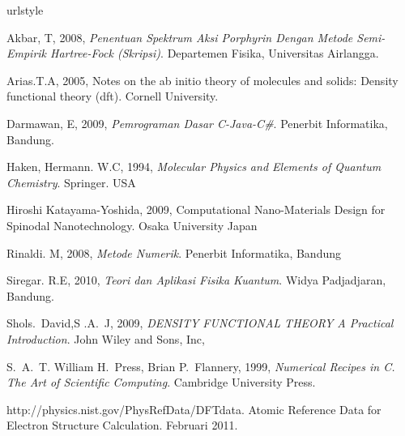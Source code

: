 



%
% 
% 


\begin{thebibliography}{7}
%
\providecommand{\natexlab}[1]{#1}
\providecommand{\url}[1]{\texttt{#1}}
\expandafter\ifx\csname urlstyle\endcsname\relax
  \providecommand{\doi}[1]{doi: #1}\else
  \providecommand{\doi}{doi: \begingroup \urlstyle{rm}\Url}\fi

Akbar, T, 2008,
\newblock \emph{Penentuan Spektrum Aksi \textit{Porphyrin} Dengan Metode
  Semi-Empirik \textit{Hartree-Fock} (Skripsi)}.
\newblock Departemen Fisika, Universitas Airlangga.

Arias.T.A, 2005,
\newblock Notes on the ab initio theory of molecules and solids: Density
  functional theory (dft).
\newblock Cornell University.

Darmawan, E, 2009,
\newblock \emph{Pemrograman Dasar C-Java-C\#}.
\newblock Penerbit Informatika, Bandung.

Haken, Hermann. W.C, 1994,
\newblock \emph{{M}olecular {P}hysics and {E}lements of {Q}uantum {C}hemistry}.
\newblock Springer. USA

Hiroshi Katayama-Yoshida, 2009,
\newblock Computational Nano-Materials Design for Spinodal Nanotechnology.
\newblock Osaka University Japan

Rinaldi. M, 2008,
\newblock \emph{Metode Numerik}.
\newblock Penerbit Informatika, Bandung

Siregar. R.E, 2010,
\newblock \emph{Teori dan Aplikasi Fisika Kuantum}.
\newblock Widya Padjadjaran, Bandung.

Shols.~David,S .A.~J, 2009,
\newblock \emph{{D}ENSITY {F}UNCTIONAL {T}HEORY A {P}ractical {I}ntroduction}.
\newblock John Wiley and Sons, Inc,

S.~A.~T. William H.~Press, Brian P.~Flannery, 1999, 
\newblock \emph{{N}umerical {R}ecipes in {C}. {T}he {A}rt of {S}cientific
  {C}omputing}.
\newblock Cambridge University Press.


http://physics.nist.gov/PhysRefData/DFTdata.
\newblock Atomic Reference Data for Electron Structure Calculation.
 Februari 2011.


\end{thebibliography}

